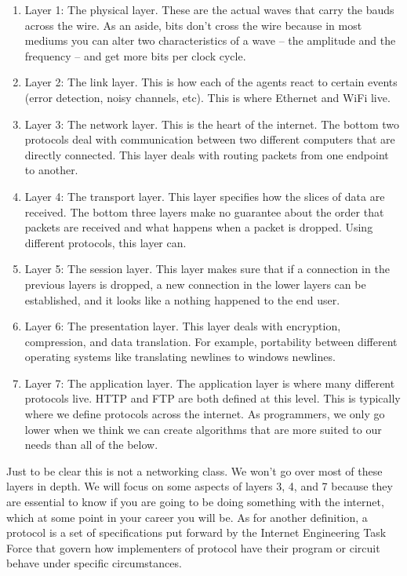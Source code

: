 \begin{enumerate}
\item Layer 1: The physical layer.
  These are the actual waves that carry the bauds across the wire.
  As an aside, bits don't cross the wire because in most mediums you can alter two characteristics of a wave -- the amplitude and the frequency -- and get more bits per clock cycle.

\item Layer 2: The link layer.
  This is how each of the agents react to certain events (error detection, noisy channels, etc).
  This is where \gls{Ethernet} and \gls{WiFi} live.

\item Layer 3: The network layer.
  This is the heart of the internet.
  The bottom two protocols deal with communication between two different computers that are directly connected.
  This layer deals with routing packets from one endpoint to another.

\item Layer 4: The transport layer.
  This layer specifies how the slices of data are received.
  The bottom three layers make no guarantee about the order that packets are received and what happens when a packet is dropped.
  Using different protocols, this layer can.

\item Layer 5: The session layer.
  This layer makes sure that if a connection in the previous layers is dropped, a new connection in the lower layers can be established, and it looks like a nothing happened to the end user.

\item Layer 6: The presentation layer.
  This layer deals with encryption, compression, and data translation.
  For example, portability between different operating systems like translating newlines to windows newlines.

\item Layer 7: The application layer.
  The application layer is where many different protocols live.
  \gls{HTTP} and \gls{FTP} are both defined at this level.
  This is typically where we define protocols across the internet.
  As programmers, we only go lower when we think we can create algorithms that are more suited to our needs than all of the below.

\end{enumerate}

Just to be clear this is not a networking class.
We won't go over most of these layers in depth.
We will focus on some aspects of layers 3, 4, and 7 because they are essential to know if you are going to be doing something with the internet, which at some point in your career you will be.
As for another definition, a protocol is a set of specifications put forward by the \gls{Internet Engineering Task Force} that govern how implementers of protocol have their program or circuit behave under specific circumstances.



